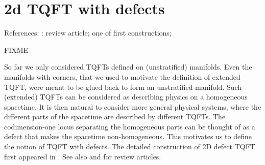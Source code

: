 \chapter{2d TQFT with defects}\label{c:2d-defects}
References: : review article; 
 one of first constructions;

FIXME

So far we only considered TQFTs defined on (unstratified) manifolds. Even the manifolds with corners, that we used to motivate the definition of extended TQFT, were meant to be glued back to form an unstratified manifold. Such (extended) TQFTs can be considered as describing physics on a homogeneous spacetime. It is then natural to consider more general physical systems, where the different parts of the spacetime are described by different TQFTs. The codimension-one locus separating the homogeneous parts can be thought of as a defect that makes the spacetime non-homogeneous. This motivates us to define the notion of TQFT with defects. The detailed construction of 2D defect TQFT first appeared in . See also  and  for review articles.

